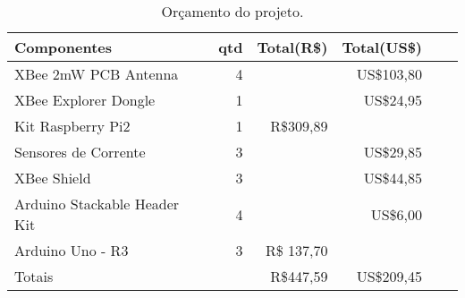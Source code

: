 \begin{table}
\centering
{\renewcommand{\arraystretch}{1.5}
\renewcommand{\tabcolsep}{0.2cm}
\begin{tabular}{|l|r|r|r|r|r|}
\hline
Componentes & qtd & Total(R\$) & Total(US\$) \\
\hline
XBee 2mW PCB Antenna & 4 & {} & US\$103,80 \\
XBee Explorer Dongle & 1 & {} & US\$24,95 \\
Kit Raspberry Pi2 & 1 & R\$309,89 & {} \\
Sensores de Corrente & 3 & {} & US\$29,85 \\
XBee Shield & 3 & {} & US\$44,85 \\
Arduino Stackable Header Kit & 4 & {} & US\$6,00 \\
Arduino Uno - R3 & 3 & R\$ 137,70 & {} \\
\hline
\multicolumn{2}{|l|}{Totais} & R\$447,59 & US\$209,45 \\
\hline
\end{tabular}}
\caption{\label{tab:orcamento} Orçamento do projeto.}
\end{table}